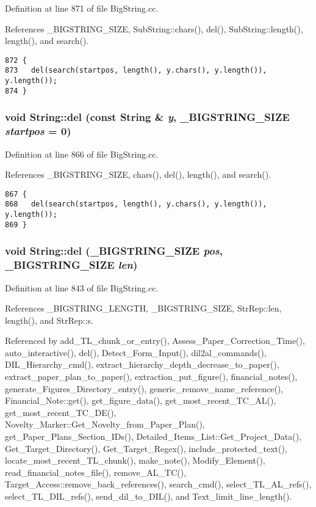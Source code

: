 Definition at line 871 of file Big\-String.cc.

References \_\-BIGSTRING\_\-SIZE, Sub\-String::chars(), del(), Sub\-String::length(), length(), and search().



\footnotesize\begin{verbatim}872 {
873   del(search(startpos, length(), y.chars(), y.length()), y.length());
874 }
\end{verbatim}\normalsize 
{}
\subsubsection{\setlength{\rightskip}{0pt plus 5cm}void String::del (const String \& {\em y}, {\bf \_\-BIGSTRING\_\-SIZE} {\em startpos} = 0)}\label{classString_a84}




Definition at line 866 of file Big\-String.cc.

References \_\-BIGSTRING\_\-SIZE, chars(), del(), length(), and search().



\footnotesize\begin{verbatim}867 {
868   del(search(startpos, length(), y.chars(), y.length()), y.length());
869 }
\end{verbatim}\normalsize 
{}
\subsubsection{\setlength{\rightskip}{0pt plus 5cm}void String::del ({\bf \_\-BIGSTRING\_\-SIZE} {\em pos}, {\bf \_\-BIGSTRING\_\-SIZE} {\em len})}\label{classString_a83}




Definition at line 843 of file Big\-String.cc.

References \_\-BIGSTRING\_\-LENGTH, \_\-BIGSTRING\_\-SIZE, Str\-Rep::len, length(), and Str\-Rep::s.

Referenced by add\_\-TL\_\-chunk\_\-or\_\-entry(), Assess\_\-Paper\_\-Correction\_\-Time(), auto\_\-interactive(), del(), Detect\_\-Form\_\-Input(), dil2al\_\-commands(), DIL\_\-Hierarchy\_\-cmd(), extract\_\-hierarchy\_\-depth\_\-decrease\_\-to\_\-paper(), extract\_\-paper\_\-plan\_\-to\_\-paper(), extraction\_\-put\_\-figure(), financial\_\-notes(), generate\_\-Figures\_\-Directory\_\-entry(), generic\_\-remove\_\-name\_\-reference(), Financial\_\-Note::get(), get\_\-figure\_\-data(), get\_\-most\_\-recent\_\-TC\_\-AL(), get\_\-most\_\-recent\_\-TC\_\-DE(), Novelty\_\-Marker::Get\_\-Novelty\_\-from\_\-Paper\_\-Plan(), get\_\-Paper\_\-Plans\_\-Section\_\-IDs(), Detailed\_\-Items\_\-List::Get\_\-Project\_\-Data(), Get\_\-Target\_\-Directory(), Get\_\-Target\_\-Regex(), include\_\-protected\_\-text(), locate\_\-most\_\-recent\_\-TL\_\-chunk(), make\_\-note(), Modify\_\-Element(), read\_\-financial\_\-notes\_\-file(), remove\_\-AL\_\-TC(), Target\_\-Access::remove\_\-back\_\-references(), search\_\-cmd(), select\_\-TL\_\-AL\_\-refs(), select\_\-TL\_\-DIL\_\-refs(), send\_\-dil\_\-to\_\-DIL(), and Text\_\-limit\_\-line\_\-length().



